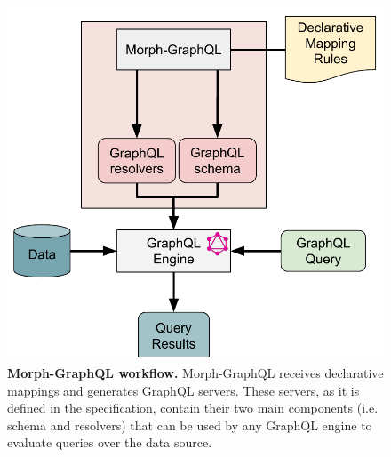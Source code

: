\begin{figure}[!ht]
    \centering
    \includegraphics[width=0.8\linewidth]{figures/workflow-morphgraphql.pdf}
    \caption[Morph-GraphQL workflow]{\textbf{Morph-GraphQL workflow.} Morph-GraphQL receives declarative mappings and generates GraphQL servers. These servers, as it is defined in the specification, contain their two main components (i.e. schema and resolvers) that can be used by any GraphQL engine to evaluate queries over the data source.}
    \label{fig:obda2graphql}
\end{figure}



